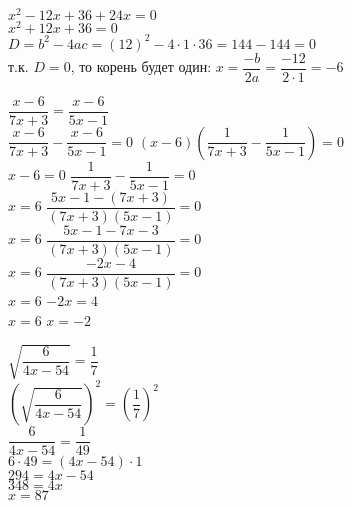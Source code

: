 \documentclass[
10pt,
paper=A4,
landscape,
DIV=calc,
twocolumn
]{article}
\begin{document}
\begin{listofex}
	\( x^2-12x+36+24x=0 \)\\
	\( x^2+12x+36=0 \)\\
	\( D=b^2-4ac=(12)^2-4\cdot1\cdot36=144-144=0 \)\\
	т.к. \( D=0 \), то корень будет один:
	\( x=\dfrac{-b}{2a}=\dfrac{-12}{2\cdot1}=-6 \)
	\item \( \dfrac{x-6}{7x+3}=\dfrac{x-6}{5x-1} \)\\
	\( \dfrac{x-6}{7x+3}-\dfrac{x-6}{5x-1}=0 \)
	\( (x-6)\left( \dfrac{1}{7x+3}-\dfrac{1}{5x-1} \right) =0\)\\
	\( x-6=0 \) \quad \quad \quad \( \dfrac{1}{7x+3}-\dfrac{1}{5x-1}=0 \)\\
	\( x=6 \) \quad \quad \quad \( \dfrac{5x-1-(7x+3)}{(7x+3)(5x-1)}=0 \)\\
	\( x=6 \) \quad \quad \quad \( \dfrac{5x-1-7x-3}{(7x+3)(5x-1)}=0 \)\\
	\( x=6 \) \quad \quad \quad \( \dfrac{-2x-4}{(7x+3)(5x-1)}=0 \)\\
	\( x=6 \) \quad \quad \quad \( -2x=4 \)\\
	\( x=6 \) \quad \quad \quad \( x=-2 \)\\
	\item \( \sqrt{\dfrac{6}{4x-54}}=\dfrac{1}{7} \)\\
	\( \left( \sqrt{\dfrac{6}{4x-54}} \right)^2=\left( \dfrac{1}{7} \right)^2 \)\\
	\( \dfrac{6}{4x-54}=\dfrac{1}{49} \)\\
	\( 6\cdot49=(4x-54)\cdot1 \)\\
	\( 294=4x-54 \)\\
	\( 348=4x \)\\
	\( x=87 \)
\end{listofex}
\end{document}

